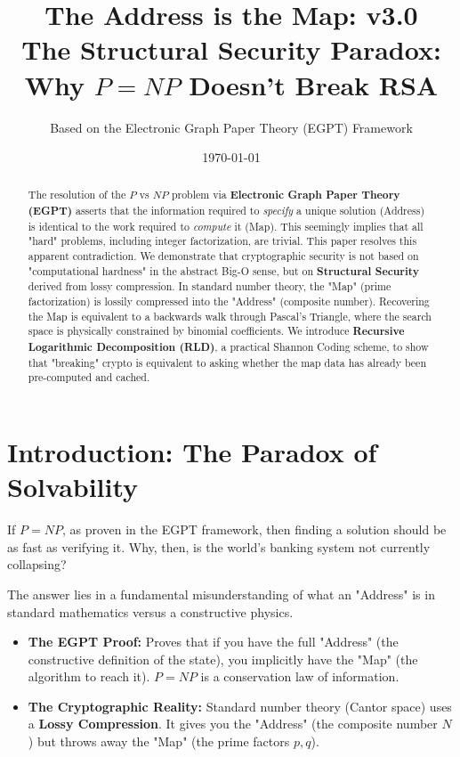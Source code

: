 \documentclass[11pt, a4paper]{article}
\title{\textbf{The Address is the Map: v3.0}\\
\large The Structural Security Paradox: Why $P=NP$ Doesn't Break RSA}
\author{Based on the Electronic Graph Paper Theory (EGPT) Framework}
\date{\today}
\begin{document}
\maketitle

\begin{abstract}
The resolution of the $P$ vs $NP$ problem via \textbf{Electronic Graph Paper Theory (EGPT)} asserts that the information required to \textit{specify} a unique solution (Address) is identical to the work required to \textit{compute} it (Map). This seemingly implies that all "hard" problems, including integer factorization, are trivial. This paper resolves this apparent contradiction. We demonstrate that cryptographic security is not based on "computational hardness" in the abstract Big-O sense, but on \textbf{Structural Security} derived from lossy compression. In standard number theory, the "Map" (prime factorization) is lossily compressed into the "Address" (composite number). Recovering the Map is equivalent to a backwards walk through Pascal's Triangle, where the search space is physically constrained by binomial coefficients. We introduce \textbf{Recursive Logarithmic Decomposition (RLD)}, a practical Shannon Coding scheme, to show that "breaking" crypto is equivalent to asking whether the map data has already been pre-computed and cached.
\end{abstract}

\section{Introduction: The Paradox of Solvability}

If $P=NP$, as proven in the EGPT framework, then finding a solution should be as fast as verifying it. Why, then, is the world's banking system not currently collapsing?

The answer lies in a fundamental misunderstanding of what an "Address" is in standard mathematics versus a constructive physics.
\begin{itemize}
    \item \textbf{The EGPT Proof:} Proves that if you have the full "Address" (the constructive definition of the state), you implicitly have the "Map" (the algorithm to reach it). $P=NP$ is a conservation law of information.
    \item \textbf{The Cryptographic Reality:} Standard number theory (Cantor space) uses a \textbf{Lossy Compression}. It gives you the "Address" (the composite number $N$) but throws away the "Map" (the prime factors $p, q$).
\end{itemize}
\end{document}
